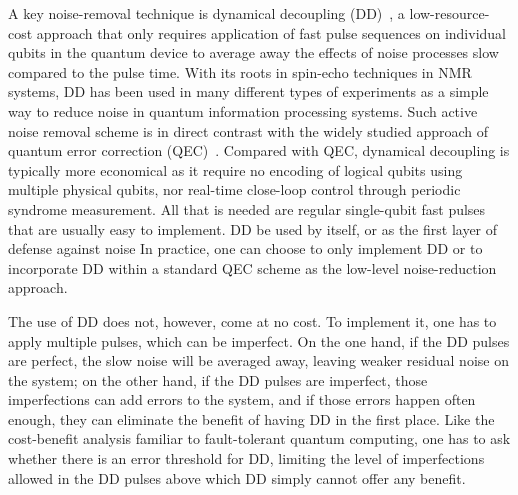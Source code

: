 \documentclass[twocolumn,pra,superscriptaddress]{revtex4-2}
\begin{document}
A key noise-removal technique is dynamical decoupling (DD)~\cite{viola1999dynamical,duan1998pulse,zanardi1999symmetrizing,khodjasteh2005fault,khodjasteh2007performance,viola2006randomized,uhrig2007keeping,pasini2010optimized,wang2011protection,ng2011combining,kuo2011quadratic}, a low-resource-cost approach that only requires application of fast pulse sequences on individual qubits in the quantum device to average away the effects of noise processes slow compared to the pulse time. With its roots in spin-echo techniques in NMR systems, DD has been used in many different types of experiments as a simple way to reduce noise in quantum information processing systems. Such active noise removal scheme is in direct contrast with the widely studied approach of quantum error correction (QEC)~\cite{Lida2013book}.
Compared with QEC,  dynamical decoupling is typically more economical as it
require no encoding of logical qubits using multiple physical qubits, nor real-time close-loop control through periodic syndrome measurement. All that is needed are regular single-qubit fast pulses that are usually easy to implement. DD be used by itself, or as the first layer of defense against noise In practice, one can choose to only implement DD or to incorporate DD within a standard QEC scheme as the low-level noise-reduction approach. 

The use of DD does not, however, come at no cost. To implement it, one has to apply multiple pulses, which can be imperfect. On the one hand, if the DD pulses are perfect, the slow noise will be averaged away, leaving weaker residual noise on the system; on the other hand, if the DD pulses are imperfect, those imperfections can add errors to the system, and if those errors happen often enough, they can eliminate the benefit of having DD in the first place. Like the cost-benefit analysis familiar to fault-tolerant quantum computing, one has to ask whether there is an error threshold for DD, limiting the level of imperfections allowed in the DD pulses above which DD simply cannot offer any benefit. 

\bigskip
\noindent{}





\end{document}

